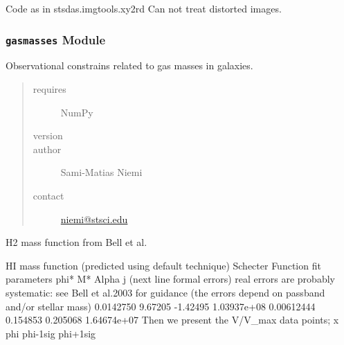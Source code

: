 \documentclass[letterpaper,10pt,english]{sphinxmanual}
\begin{document}

\begin{fulllineitems}
\label{SamPy.astronomy:SamPy.astronomy.footprintfinder.xy2rd}
Code as in stsdas.imgtools.xy2rd
Can not treat distorted images.

\end{fulllineitems}



\subsubsection{\texttt{gasmasses} Module}
\label{SamPy.astronomy:gasmasses-module}\label{SamPy.astronomy:module-SamPy.astronomy.gasmasses}
Observational constrains related to gas masses in galaxies.
\begin{quote}\begin{description}
\item[{requires}] \leavevmode
NumPy

\item[{version}] 

\item[{author}] \leavevmode
Sami-Matias Niemi

\item[{contact}] \leavevmode
\href{mailto:niemi@stsci.edu}{niemi@stsci.edu}

\end{description}\end{quote}


\begin{fulllineitems}
\label{SamPy.astronomy:SamPy.astronomy.gasmasses.H2MassFunctionBell}
H2 mass function from Bell et al.

\end{fulllineitems}



\begin{fulllineitems}
\label{SamPy.astronomy:SamPy.astronomy.gasmasses.HIMassFunctionBell}
HI mass function (predicted using default technique)
Schecter Function fit parameters
phi* M* Alpha j  (next line formal errors)
real errors are probably systematic: see Bell et al.2003 for
guidance (the errors depend on passband and/or stellar mass)
0.0142750      9.67205     -1.42495  1.03937e+08
0.00612444     0.154853     0.205068  1.64674e+07
Then we present the V/V\_max data points; x   phi  phi-1sig  phi+1sig

\end{fulllineitems}
\end{document}
